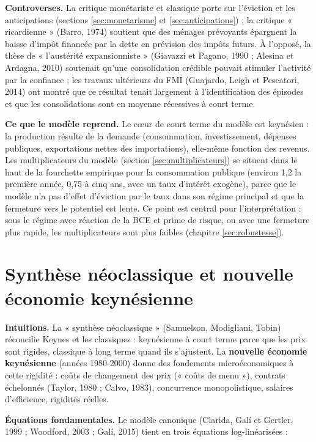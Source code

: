 \documentclass[
  11pt,
  11pt,
  a4paper,
  openany]{book}
\begin{document}
\textbf{Controverses.} La critique monétariste et classique porte sur
l'éviction et les anticipations (sections \ref{sec:monetarisme} et
\ref{sec:anticipations}) ; la critique « ricardienne » (Barro, 1974)
soutient que des ménages prévoyants épargnent la baisse d'impôt financée
par la dette en prévision des impôts futurs. À l'opposé, la thèse de «
l'austérité expansionniste » (Giavazzi et Pagano, 1990 ; Alesina et
Ardagna, 2010) soutenait qu'une consolidation crédible pouvait stimuler
l'activité par la confiance ; les travaux ultérieurs du FMI (Guajardo,
Leigh et Pescatori, 2014) ont montré que ce résultat tenait largement à
l'identification des épisodes et que les consolidations sont en moyenne
récessives à court terme.

\textbf{Ce que le modèle reprend.} Le cœur de court terme du modèle est
keynésien : la production résulte de la demande (consommation,
investissement, dépenses publiques, exportations nettes des
importations), elle-même fonction des revenus. Les multiplicateurs du
modèle (section \ref{sec:multiplicateurs}) se situent dans le haut de la
fourchette empirique pour la consommation publique (environ 1,2 la
première année, 0,75 à cinq ans, avec un taux d'intérêt exogène), parce
que le modèle n'a pas d'effet d'éviction par le taux dans son régime
principal et que la fermeture vers le potentiel est lente. Ce point est
central pour l'interprétation : sous le régime avec réaction de la BCE
et prime de risque, ou avec une fermeture plus rapide, les
multiplicateurs sont plus faibles (chapitre \ref{sec:robustesse}).

\hypertarget{sec:nouvelle-keynesienne}{%
\section{Synthèse néoclassique et nouvelle économie
keynésienne}\label{sec:nouvelle-keynesienne}}

\textbf{Intuitions.} La « synthèse néoclassique » (Samuelson,
Modigliani, Tobin) réconcilie Keynes et les classiques : keynésienne à
court terme parce que les prix sont rigides, classique à long terme
quand ils s'ajustent. La \textbf{nouvelle économie keynésienne} (années
1980-2000) donne des fondements microéconomiques à cette rigidité :
coûts de changement des prix (« coûts de menu »), contrats échelonnés
(Taylor, 1980 ; Calvo, 1983), concurrence monopolistique, salaires
d'efficience, rigidités réelles.

\textbf{Équations fondamentales.} Le modèle canonique (Clarida, Galí et
Gertler, 1999 ; Woodford, 2003 ; Galí, 2015) tient en trois équations
log-linéarisées :
\end{document}
